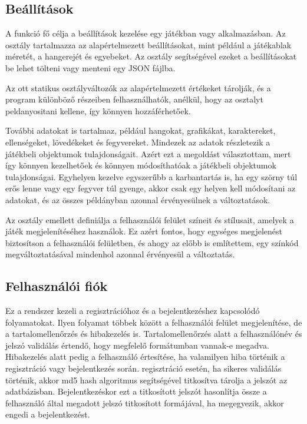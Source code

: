 \subsection{Beállítások}
 A funkció fő célja a beállítások kezelése egy játékban vagy alkalmazásban. Az osztály tartalmazza az alapértelmezett beállításokat, mint például a játékablak méretét, a hangerejét és egyebeket. Az osztály segítségével ezeket a beállításokat be lehet tölteni vagy menteni egy JSON fájlba.

Az ott statikus osztályváltozók az alapértelmezett értékeket tárolják, és a program különböző részeiben felhasználhatók, anélkül, hogy az osztalyt peldanyositani kellene, így könnyen hozzáférhetőek.

További adatokat is tartalmaz, például hangokat, grafikákat, karaktereket, ellenségeket, lövedékeket és fegyvereket. Mindezek az adatok részletezik a játékbeli objektumok tulajdonságait. Azért ezt a megoldást választottam, mert így könnyen kezelhetőek és könnyen módosíthatóak a játékbeli objektumok tulajdonságai. Egyhelyen kezelve egyszerűbb a karbantartás is, ha egy szörny túl erős lenne vagy egy fegyver túl gyenge, akkor csak egy helyen kell módosítani az adatokat, és az összes példányban azonnal érvényesülnek a változtatások.

Az osztály emellett definiálja a felhasználói felület színeit és stílusait, amelyek a játék megjelenítéséhez használok. Ez azért fontos, hogy egységes megjelenést biztosítson a felhasználói felületben, és ahogy az előbb is említettem, egy színkód megváltoztatásával mindenhol azonnal érvényesül a változtatás.


\subsection{Felhasználói fiók}
 Ez a rendszer kezeli a regisztrációhoz és a bejelentkezéshez kapcsolódó folyamatokat. Ilyen folyamat többek között a felhasználói felület megjelenítése, de a tartalomellenőrzés és hibakezelés is. Tartalomellenőrzés alatt a felhasználónév és jelszó validálás értendő, hogy megfelelő formátumban vannak-e megadva. Hibakezelés alatt pedig a felhasználó értesítése, ha valamilyen hiba történik a regisztráció vagy bejelentkezés során. regisztráció esetén, ha sikeres validálás történik, akkor md5 hash algoritmus segítségével titkosítva tárolja a jelszót az adatbázisban. Bejelentkezéskor ezt a titkosított jelszót hasonlítja össze a felhasználó által megadott jelszó titkosított formájával, ha megegyezik, akkor engedi a bejelentkezést.

